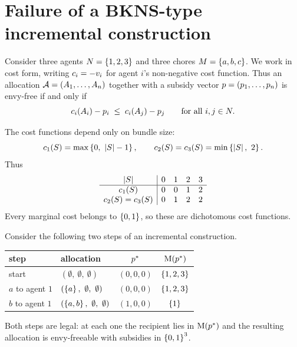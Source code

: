 
\section{Failure of a BKNS-type incremental construction}
\label{app:extension-failure-sec}

\begin{example}
\label{app:extension-failure}
Consider three agents $N = \left\{1,2,3\right\}$ and three chores
$M = \left\{a,b,c\right\}$. We work in cost form, writing $c_i = -v_i$ for
agent $i$'s non-negative cost function. Thus an allocation
$\mathcal{A} = (A_{1},\dots,A_{n})$ together with a subsidy vector
$p = (p_1,\dots,p_n)$ is envy-free if and only if
\[
  c_i(A_{i}) - p_i \;\le\; c_i(A_{j}) - p_j
  \qquad \text{for all } i,j \in N .
\]

The cost functions depend only on bundle size:
\[
  c_1(S) = \max\left\{0,\ \left\lvert S\right\rvert - 1\right\},
  \qquad
  c_2(S) = c_3(S) = \min\left\{\left\lvert S\right\rvert,\ 2\right\}.
\]
Thus
\[
  \begin{array}{c|cccc}
    \left\lvert S\right\rvert & 0 & 1 & 2 & 3 \\
    \hline
    c_1(S) & 0 & 0 & 1 & 2 \\
    c_2(S) = c_3(S) & 0 & 1 & 2 & 2
  \end{array}
\]
Every marginal cost belongs to $\left\{0,1\right\}$, so these are dichotomous cost
functions.

Consider the following two steps of an incremental construction.
\begin{center}
\begin{tabular}{llcc}
step & allocation & $p^{*}$ & $\mathrm{M}(p^{*})$ \\
\hline
start & $(\emptyset,\ \emptyset,\ \emptyset)$ & $(0,0,0)$ & $\left\{1,2,3\right\}$ \\
$a$ to agent $1$ & $(\set{a},\ \emptyset,\ \emptyset)$ & $(0,0,0)$ & $\left\{1,2,3\right\}$ \\
$b$ to agent $1$ & $(\set{a,b},\ \emptyset,\ \emptyset)$ & $(1,0,0)$ & $\left\{1\right\}$ \\
\end{tabular}
\end{center}
Both steps are legal: at each one the recipient lies in $\mathrm{M}(p^{*})$
and the resulting allocation is envy-freeable with subsidies in $\left\{0,1\right\}^3$.


\end{example}
